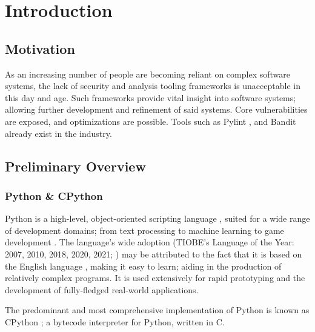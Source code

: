 \chapter{Introduction}


    \section{Motivation} %
    \par As an increasing number of people are becoming reliant on complex software systems, the lack of security and analysis
    tooling frameworks is unacceptable in this day and age. Such frameworks provide vital insight into software systems;
    allowing further development and refinement of said systems. Core vulnerabilities are exposed, and optimizations are possible.
    Tools such as Pylint \cite{pylint2021}, and Bandit \cite{bandit2022} already exist in the industry.

    \section{Preliminary Overview}
    \subsection{Python \& CPython}
    \par Python is a high-level, object-oriented scripting language \cite{lutz2001programming}, 
    suited for a wide range of development domains; from text processing \cite{bonta2019comprehensive} to 
    machine learning \cite{tensorflowTour} to game development \cite{sweigart2012making}. 
    The language's wide adoption (TIOBE's Language of the Year: 2007, 2010, 2018, 2020, 2021; \cite{tiobe2022index}) 
    may be attributed to the fact that it is based on the English language \cite{saabith2019python}, 
    making it easy to learn; aiding in the production of relatively complex programs. It is used extensively for rapid prototyping and the development of fully-fledged real-world applications.

    \par The predominant and most comprehensive implementation of Python is known as CPython \cite{van2021python}; a bytecode interpreter for Python, written in C.

